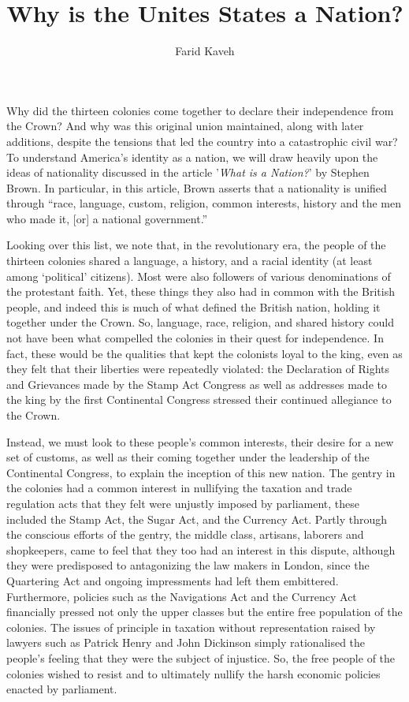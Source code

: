 \documentclass[a4paper]{article}
\begin{document}
\title{Why is the Unites States a Nation?}
\subtitle{}
\author{Farid Kaveh}

\maketitle

Why did the thirteen colonies come together to declare their independence from the Crown? And why was this original union maintained, along with later additions, despite the tensions that led the country into a catastrophic civil war? To understand America’s identity as a nation, we will draw heavily upon the ideas of nationality discussed in the article '\textit{What is a Nation?}' by Stephen Brown. In particular, in this article, Brown asserts that a nationality is unified through “race, language, custom, religion, common interests, history and the men who made it, [or] a national government.” \autocite[]{10.2307/30083977}

Looking over this list, we note that, in the revolutionary era, the people of the thirteen colonies shared a language, a history, and a racial identity (at least among ‘political’ citizens). Most were also followers of various denominations of the protestant faith. Yet, these things they also had in common with the British people, and indeed this is much of what defined the British nation, holding it together under the Crown. So, language, race, religion, and shared history could not have been what compelled the colonies in their quest for independence. In fact, these would be the qualities that kept the colonists loyal to the king, even as they felt that their liberties were repeatedly violated: the Declaration of Rights and Grievances made by the Stamp Act Congress as well as addresses made to the king by the first Continental Congress stressed their continued allegiance to the Crown. \autocite[pp. 172-173, 158-159]{AmericanRep1}

Instead, we must look to these people’s common interests, their desire for a new set of customs, as well as their coming together under the leadership of the Continental Congress, to explain the inception of this new nation. The gentry in the colonies had a common interest in nullifying the taxation and trade regulation acts that they felt were unjustly imposed by parliament, these included the Stamp Act, the Sugar Act, and the Currency Act.\autocite[pp. 158-160]{AmericanRep1} Partly through the conscious efforts of the gentry, the middle class, artisans, laborers and shopkeepers, came to feel  that they too had an interest in this dispute, although they were predisposed to antagonizing the law makers in London, since the Quartering Act and ongoing impressments had left them embittered. Furthermore, policies such as the Navigations Act and the Currency Act financially pressed not only the upper classes but the entire free population of the colonies. The issues of principle in taxation without representation raised by lawyers such as Patrick Henry and John Dickinson simply rationalised the people’s feeling that they were the subject of injustice. So, the free people of the colonies wished to resist and to ultimately nullify the harsh economic policies enacted by parliament.
\end{document}
